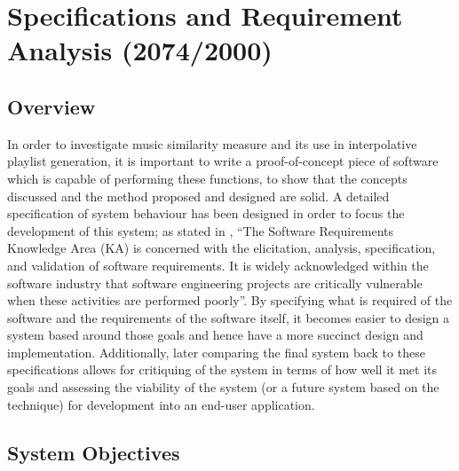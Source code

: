 %
%
\newcommand{\objective}[1]{
	\subsubsection{#1}
}
\chapter{Specifications and Requirement Analysis (2074/2000)}
\section{Overview}
In order to investigate music similarity measure and its use in interpolative playlist generation, it is important to write a proof-of-concept piece of software which is capable of performing these functions, to show that the concepts discussed and the method proposed and designed are solid. A detailed specification of system behaviour has been designed in order to focus the development of this system; as stated in \citet{Bourque2004}, ``The Software Requirements Knowledge Area (KA) is concerned with the elicitation, analysis, specification, and validation of software requirements. It is widely acknowledged within the software industry that software engineering projects are critically vulnerable when these activities are performed poorly''. By specifying what is required of the software and the requirements of the software itself, it becomes easier to design a system based around those goals and hence have a more succinct design and implementation. Additionally, later comparing the final system back to these specifications allows for critiquing of the system in terms of how well it met its goals and  assessing the viability of the system (or a future system based on the technique) for development into an end-user application.
\section{System Objectives}
